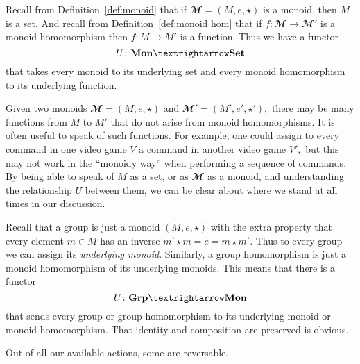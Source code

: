 \documentclass[../main/CT4S-EN-RU]{subfiles}
\begin{document}
\begin{definitionRUS}\label{def:functor}
\end{definitionRUS}

\begin{exampleENG}
Recall from Definition~\ref{def:monoid} that if ${𝓜}=(M,e,{⋆})$ is a monoid, then $M$ is a set. And recall from Definition~\ref{def:monoid hom} that if $f\colon{𝓜}{→}{𝓜}'$ is a monoid homomorphism then $f\colon M{→} M'$ is a function. Thus we have a functor $$U\colon\Mon{→}\Set$$ that takes every monoid to its underlying set and every monoid homomorphism to its underlying function. 

Given two monoids ${𝓜}=(M,e,{⋆})$ and ${𝓜}'=(M',e',{⋆}'),$ there may be many functions from $M$ to $M'$ that do not arise from monoid homomorphisms. It is often useful to speak of such functions. For example, one could assign to every command in one video game $V$ a command in another video game $V',$ but this may not work in the “monoidy way” when performing a sequence of commands. By being able to speak of $M$ as a set, or as ${𝓜}$ as a monoid, and understanding the relationship $U$ between them, we can be clear about where we stand at all times in our discussion.
\end{exampleENG}

\begin{exampleRUS}
\end{exampleRUS}

\begin{exampleENG}\label{ex:grp to monoid}
Recall that a group is just a monoid $(M,e,{⋆})$ with the extra property that every element $m\in M$ has an inverse $m'{⋆} m=e=m{⋆} m'.$ Thus to every group we can assign its {\em underlying monoid}. Similarly, a group homomorphism is just a monoid homomorphism of its underlying monoids. This means that there is a functor $$U\colon\Grp{→}\Mon$$ that sends every group or group homomorphism to its underlying monoid or monoid homomorphism. That identity and composition are preserved is obvious.
\end{exampleENG}

\begin{exampleRUS}\label{ex:grp to monoid}
\end{exampleRUS}

\begin{sloganENG}
Out of all our available actions, some are reversable. 
\end{sloganENG}
\end{document}
